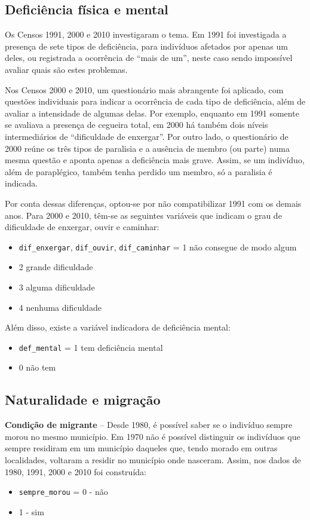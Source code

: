 \documentclass[12pt,a4paper]{article}
\newcommand{\vr}[1]{\texttt{#1}}
\begin{document}
\subsection{Deficiência física e mental}\label{sec:d6}
Os Censos 1991, 2000 e 2010 investigaram o tema. Em 1991 foi investigada a presença de sete tipos de deficiência, para indivíduos afetados por apenas um deles, ou registrada a ocorrência de “mais de um”, neste caso sendo impossível avaliar quais são estes problemas.

Nos Censos 2000 e 2010, um questionário mais abrangente foi aplicado, com questões individuais para indicar a ocorrência de cada tipo de deficiência, além de avaliar a intensidade de algumas delas. Por exemplo, enquanto em 1991 somente se avaliava a presença de cegueira total, em 2000 há também dois níveis intermediários de “dificuldade de enxergar”. Por outro lado, o questionário de 2000 reúne os três tipos de paralisia e a ausência de membro (ou parte) numa mesma questão e aponta apenas a deficiência mais grave. Assim, se um indivíduo, além de paraplégico, também tenha perdido um membro, só a paralisia é indicada.

Por conta dessas diferenças, optou-se por não compatibilizar 1991 com os demais anos. Para 2000 e 2010, têm-se as seguintes variáveis que indicam o grau de dificuldade de enxergar, ouvir e caminhar:
\begin{itemize}
  \item \vr{dif\_enxergar}, \vr{dif\_ouvir}, \vr{dif\_caminhar} = 1 não consegue de modo algum
  \item 2 grande dificuldade
  \item 3 alguma dificuldade
  \item 4 nenhuma dificuldade
\end{itemize}

Além disso, existe a variável indicadora de deficiência mental:
\begin{itemize}
  \item \vr{def\_mental} = 1 tem deficiência mental
  \item 0 não tem
\end{itemize}

\subsection{Naturalidade e migração}\label{sec:d7}
\textbf{Condição de migrante} -- Desde 1980, é possível saber se o indivíduo sempre morou no mesmo município. Em 1970 não é possível distinguir os indivíduos que sempre residiram em um município daqueles que, tendo morado em outras localidades, voltaram a residir no município onde nasceram. Assim, nos dados de 1980, 1991, 2000 e 2010 foi construída:
\begin{itemize}
  \item \vr{sempre\_morou} = 0 - não
  \item 1 - sim
\end{itemize}
\end{document}
